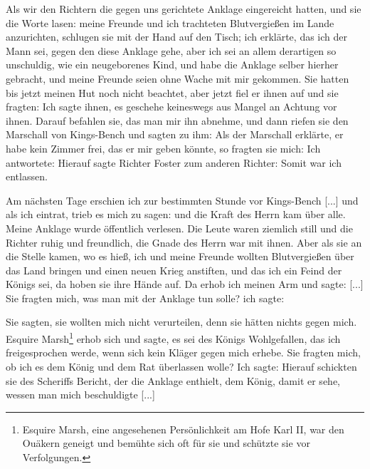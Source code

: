 Als wir den Richtern die gegen uns gerichtete Anklage eingereicht 
hatten, und sie die Worte lasen: meine Freunde und ich
trachteten Blutvergießen im Lande anzurichten, schlugen sie mit
der Hand auf den Tisch; ich erklärte, das ich der Mann sei,
gegen den diese Anklage gehe, aber ich sei an allem derartigen
so unschuldig, wie ein neugeborenes Kind, und habe die Anklage
selber hierher gebracht, und meine Freunde seien ohne Wache mit
mir gekommen. Sie hatten bis jetzt meinen Hut noch nicht
beachtet, aber jetzt fiel er ihnen auf und sie fragten:  Ich sagte ihnen, es geschehe keineswegs
aus Mangel an Achtung vor ihnen. Darauf befahlen sie, das
man mir ihn abnehme, und dann riefen sie den Marschall von
Kings-Bench und sagten zu ihm:  Als der Marschall erklärte, er
habe kein Zimmer frei, das er mir geben könnte, so fragten sie
mich:  Ich antwortete:  Hierauf sagte Richter 
Foster zum anderen Richter:
 Somit war ich entlassen. 


Am nächsten Tage erschien
ich zur bestimmten Stunde vor Kings-Bench 
[...] und als ich
eintrat, trieb es mich zu sagen:  und die
Kraft des Herrn kam über alle. Meine Anklage wurde öffentlich
verlesen. Die Leute waren ziemlich still und die Richter ruhig
und freundlich, die Gnade des Herrn war mit ihnen. Aber als
sie an die Stelle kamen, wo es hieß, ich und meine Freunde
wollten Blutvergießen über das Land bringen und einen neuen
Krieg anstiften, und das ich ein Feind der Königs sei, da hoben
sie ihre Hände auf. Da erhob ich meinen Arm und sagte:  [...]
Sie fragten mich, was man mit der Anklage tun solle? ich sagte:

Sie sagten, sie wollten mich nicht verurteilen, denn sie hätten
nichts gegen mich. Esquire Marsh\footnote{Esquire Marsh, eine 
angesehenen Persönlichkeit am Hofe Karl II, war den
Ouäkern geneigt und bemühte sich oft für sie und schützte sie vor 
Verfolgungen.} erhob sich und sagte, es sei
des Königs Wohlgefallen, das ich freigesprochen werde, wenn sich
kein Kläger gegen mich erhebe. Sie fragten mich, ob ich es dem
König und dem Rat überlassen wolle? Ich sagte: 
Hierauf schickten sie des Scheriffs Bericht, der die Anklage enthielt,
dem König, damit er sehe, wessen man mich beschuldigte [...]

